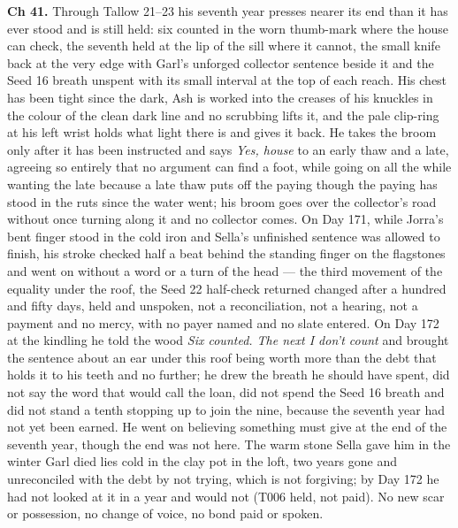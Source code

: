 \documentclass{design/chronicle}
\begin{document}
{\textbf{Ch 41.} Through Tallow 21–23 his seventh year presses nearer its end than it has ever stood and is still held: six counted in the worn thumb-mark where the house can check, the seventh held at the lip of the sill where it cannot, the small knife back at the very edge with Garl’s unforged collector sentence beside it and the Seed 16 breath unspent with its small interval at the top of each reach. His chest has been tight since the dark, Ash is worked into the creases of his knuckles in the colour of the clean dark line and no scrubbing lifts it, and the pale clip-ring at his left wrist holds what light there is and gives it back. He takes the broom only after it has been instructed and says \emph{Yes, house} to an early thaw and a late, agreeing so entirely that no argument can find a foot, while going on all the while wanting the late because a late thaw puts off the paying though the paying has stood in the ruts since the water went; his broom goes over the collector’s road without once turning along it and no collector comes. On Day 171, while Jorra’s bent finger stood in the cold iron and Sella’s unfinished sentence was allowed to finish, his stroke checked half a beat behind the standing finger on the flagstones and went on without a word or a turn of the head — the third movement of the equality under the roof, the Seed 22 half-check returned changed after a hundred and fifty days, held and unspoken, not a reconciliation, not a hearing, not a payment and no mercy, with no payer named and no slate entered. On Day 172 at the kindling he told the wood \emph{Six counted. The next I don’t count} and brought the sentence about an ear under this roof being worth more than the debt that holds it to his teeth and no further; he drew the breath he should have spent, did not say the word that would call the loan, did not spend the Seed 16 breath and did not stand a tenth stopping up to join the nine, because the seventh year had not yet been earned. He went on believing something must give at the end of the seventh year, though the end was not here. The warm stone Sella gave him in the winter Garl died lies cold in the clay pot in the loft, two years gone and unreconciled with the debt by not trying, which is not forgiving; by Day 172 he had not looked at it in a year and would not (T006 held, not paid). No new scar or possession, no change of voice, no bond paid or spoken.

\begin{itemize}[leftmargin=1.4em,itemsep=1pt,topsep=3pt,parsep=0pt]


\end{itemize}}
\end{document}
